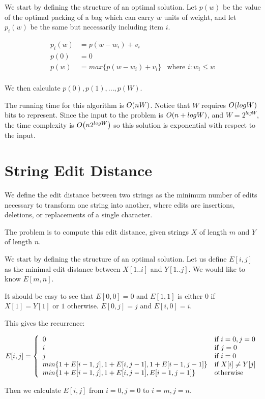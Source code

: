 We start by defining the structure of an optimal solution.  Let $p(w)$
be the value of the optimal packing of a bag which can carry $w$ units
of weight, and let $p_i(w)$ be the same but necessarily including item
$i$.

\begin{align*}
  p_i(w) &= p(w - w_i) + v_i & \\
  p(0)   &= 0 & \\
  p(w)   &= max \{ p(w - w_i) + v_i \} & \text{where $i : w_i \leq w$} \\
\end{align*}

We then calculate $p(0), p(1), ..., p(W)$.

The running time for this algorithm is $O\!\left(nW\right)$.  Notice that $W$
requires $O\!\left(logW\right)$ bits to represent.  Since the input to the
problem is $O\!\left(n + logW\right)$, and $W = 2^{logW}$, the time complexity
is $O\!\left(n2^{logW}\right)$ so this solution is exponential with respect to
the input.

\section{String Edit Distance}

We define the edit distance between two strings as the minimum number
of edits necessary to transform one string into another, where edits
are insertions, deletions, or replacements of a single character.

The problem is to compute this edit distance, given strings $X$ of
length $m$ and $Y$ of length $n$.

We start by defining the structure of an optimal solution.  Let us
define $E[i,j]$ as the minimal edit distance between $X[1..i]$ and
$Y[1..j]$.  We would like to know $E[m,n]$.

It should be easy to see that $E[0,0] = 0$ and $E[1,1]$ is either $0$
if $X[1] = Y[1]$ or $1$ otherwise.  $E[0,j] = j$ and $E[i,0] = i$.

This gives the recurrence:

\begin{math}
  E[i,j] = \left\{
    \begin{array}{l l}
      0 & \text{if } i=0,j=0 \\
      i & \text{if } j=0 \\
      j & \text{if } i=0 \\
      min \{ 1 + E[i-1,j], 1 + E[i,j-1], 1 + E[i-1,j-1] \} & \text{if } X[i] \neq Y[j] \\
      min \{ 1 + E[i-1,j], 1 + E[i,j-1], E[i-1,j-1] \} & \text{otherwise} \\
    \end{array} \right.
\end{math}

Then we calculate $E[i,j]$ from $i=0,j=0$ to $i=m,j=n$.



